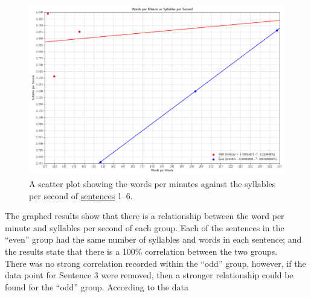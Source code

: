 \documentclass[lab=1,title={Speaking rate},turnin=false]{com310lab}
\begin{document}
\begin{results}%


	\begin{figure}[H]
		\centering
		\caption{A scatter plot showing the words per minutes against the syllables per second of \hyperref[tab:data]{sentences} 1--6.}
		\label{fig:results}
		\includegraphics[width=\textwidth]{washington_lab1_graph}
	\end{figure}
\end{results}

\begin{discussion}%
	The graphed results show that there is a relationship between the word per minute and syllables per second of each group.
	Each of the sentences in the ``even'' group had the same number of syllables and words in each sentence;
	and the results state that there is a 100\% correlation between the two groups.\\

	There was no strong correlation recorded within the ``odd'' group, however, if the data point for Sentence 3 were removed, then a stronger relationship could be found for the ``odd'' group.
	According to the data
\end{discussion}
\end{document}
